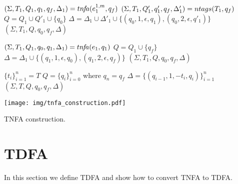 \documentclass[]{article}
\let\oldnl\nl%
\newcommand{\nonl}{\renewcommand{\nl}{\let\nl\oldnl}}%
\begin{document}
\begin{algorithm}[]
\begin{multicols}{2}
{     {
        $(\Sigma, T_1, Q_1, q_1, q_f, \Delta_1) = tn\!f\!a (e_1^{1, m}, q_f)$ \;
        $(\Sigma, T_1, Q'_1, q'_1, q_f, \Delta'_1) = ntags (T_1, q_f)$ \;
        $Q = Q_1 \cup Q'_1 \cup \{q_0\}$ \;
        $\Delta = \Delta_1 \cup \Delta'_1 \cup \{ (q_0, 1, \epsilon, q_1), (q_0, 2, \epsilon, q'_1) \}$ \;
        \Return $(\Sigma, T_1, Q, q_0, q_f, \Delta)$
    }
    \BlankLine
    \BlankLine

     {
        $(\Sigma, T_1, Q_1, q_0, q_1, \Delta_1) = tn\!f\!a (e_1, q_1)$ \;
        $Q = Q_1 \cup \{q_f\}$ \;
        $\Delta = \Delta_1 \cup \{ (q_1, 1, \epsilon, q_0), (q_1, 2, \epsilon, q_f) \}$ \;
        \Return $(\Sigma, T_1, Q, q_0, q_f, \Delta)$
    }
    }
    \vspace{2em}

    \nonl{} {
        \Indp
        $\{ t_i \}_{i=1}^n = T$ \;
        $Q = \{q_i\}_{i=0}^n$ where $q_n = q_f$ \;
        $\Delta = \{ (q_{i-1}, 1, -t_i, q_i) \}_{i=1}^n$ \;
        \Return $(\Sigma, T, Q, q_0, q_f, \Delta)$ \;
    }

    \vfill\null

\columnbreak

    \nonl \texttt{[image: img/tnfa\_construction.pdf]}

\end{multicols}
\vspace{1em}
\caption{TNFA construction.}\label{alg_tnfa}
\end{algorithm}


\pagebreak

\section{TDFA}\label{section_tdfa}

In this section we define TDFA and show how to convert TNFA to TDFA.
\end{document}

